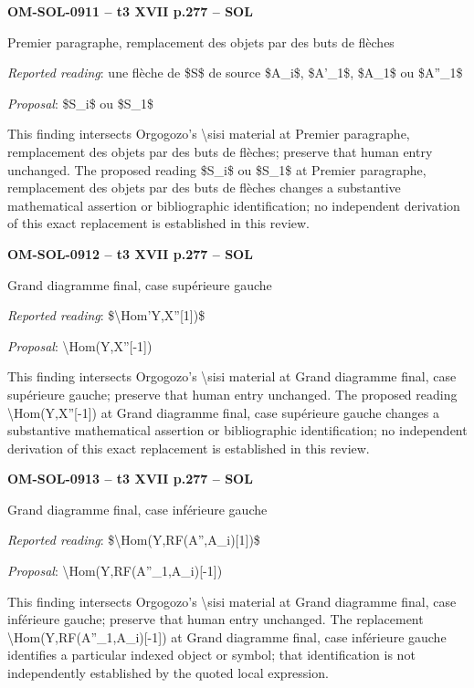 \par\noindent\textbf{OM-SOL-0911 -- t3 XVII p.277 -- SOL}\par
Premier paragraphe, remplacement des objets par des buts de flèches\par
\emph{Reported reading}: une flèche de \$S\$ de source \$A\_i\$, \$A'\_1\$, \$A\_1\$ ou \$A''\_1\$\par
\emph{Proposal}: \$S\_i\$ ou \$S\_1\$\par
This finding intersects Orgogozo's \textbackslash{}sisi material at Premier paragraphe, remplacement des objets par des buts de flèches; preserve that human entry unchanged. The proposed reading \$S\_i\$ ou \$S\_1\$ at Premier paragraphe, remplacement des objets par des buts de flèches changes a substantive mathematical assertion or bibliographic identification; no independent derivation of this exact replacement is established in this review.\par
\par\noindent\textbf{OM-SOL-0912 -- t3 XVII p.277 -- SOL}\par
Grand diagramme final, case supérieure gauche\par
\emph{Reported reading}: \$\textbackslash{}Hom'Y,X''[1])\$\par
\emph{Proposal}: \textbackslash{}Hom(Y,X''[-1])\par
This finding intersects Orgogozo's \textbackslash{}sisi material at Grand diagramme final, case supérieure gauche; preserve that human entry unchanged. The proposed reading \textbackslash{}Hom(Y,X''[-1]) at Grand diagramme final, case supérieure gauche changes a substantive mathematical assertion or bibliographic identification; no independent derivation of this exact replacement is established in this review.\par
\par\noindent\textbf{OM-SOL-0913 -- t3 XVII p.277 -- SOL}\par
Grand diagramme final, case inférieure gauche\par
\emph{Reported reading}: \$\textbackslash{}Hom(Y,RF(A'',A\_i)[1])\$\par
\emph{Proposal}: \textbackslash{}Hom(Y,RF(A''\_1,A\_i)[-1])\par
This finding intersects Orgogozo's \textbackslash{}sisi material at Grand diagramme final, case inférieure gauche; preserve that human entry unchanged. The replacement \textbackslash{}Hom(Y,RF(A''\_1,A\_i)[-1]) at Grand diagramme final, case inférieure gauche identifies a particular indexed object or symbol; that identification is not independently established by the quoted local expression.\par
